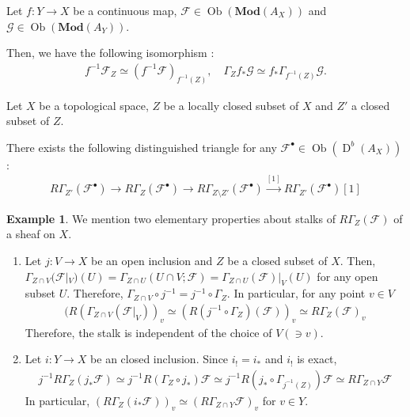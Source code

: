 \documentclass[a4paper,dvipdfmx,reqno,12pt]{amsart}
\theoremstyle{definition}
\newtheorem{Eg}[Thm]{Example}
\newcommand{\mcal}[1]{\mathcal{#1}}%
\newcommand{\opn}[1]{\operatorname{#1}}
\newcommand{\catn}[1]{\mathbf{#1}}
\newcommand{\xto}[1]{\xrightarrow{#1}}
\numberwithin{equation}{section}
\begin{document}
Let $f\colon Y\to X$ be a continuous map,
$\mathcal{F}\in \opn{Ob}(\catn{Mod}(A_X))$
and $\mathcal{G}\in\opn{Ob}(\catn{Mod}(A_Y))$.

Then, we have the following isomorphism 
\cite[(2.3.19)-(2.3.20)]{MR1299726}:
\begin{align}
f^{-1}\mathcal{F}_Z\simeq 
(f^{-1}\mathcal{F})_{f^{-1}(Z)},\quad 
\Gamma_Zf_*\mathcal{G}\simeq f_*\Gamma_{f^{-1}(Z)}
\mathcal{G}.
\end{align}


Let $X$ be a topological space, $Z$ be a locally 
closed subset of $X$ and $Z'$ a closed subset of $Z$.

There exists the following distinguished triangle 
for any $\mathcal{F}^{\bullet}\in \opn{Ob}(\opn{D}^{b}(A_X))$ 
\cite[(2.6.32)]{MR1299726}:
\begin{align} \label{eq: exactlocal}
  R\Gamma_{Z'}(\mcal{F}^{\bullet})\to 
R\Gamma_{Z}(\mcal{F}^{\bullet})\to 
R\Gamma_{Z\setminus Z'}(\mcal{F}^{\bullet})\xto{[1]} 
R\Gamma_{Z'}(\mcal{F}^{\bullet})[1]
\end{align}



\begin{Eg}

We mention two elementary properties 
about stalks of $R\Gamma_{Z}(\mcal{F})$ of a sheaf on 
$X$.

\begin{enumerate}
\item Let $j:V\to X$ be an open inclusion and $Z$ be a 
closed subset of $X$.
Then, $\Gamma_{Z\cap V}(\mcal{F}|_V)(U)=
\Gamma_{Z\cap U}(U\cap V;\mcal{F})=\Gamma_{Z\cap U}(\mcal{F})|_V(U)$
for any open subset $U$.
Therefore, $\Gamma_{Z\cap V}\circ j^{-1}=j^{-1}\circ \Gamma_{Z}$.
In particular, for any point $v\in V$
\begin{align}
  (R(\Gamma_{Z\cap V}(\mcal{F}|_{V}))_v\simeq (R(j^{-1}\circ \Gamma_{Z})(\mcal{F}))_v\simeq R\Gamma_{Z}(\mcal{F})_v
\end{align}
Therefore, the stalk is independent of 
the choice of $V (\ni v)$.
\item Let $i: Y\to X$ be an closed inclusion.
Since $i_!=i_*$ and $i_!$ is exact,
\begin{align}
  j^{-1}R\Gamma_{Z}(j_*\mcal{F})\simeq j^{-1}R(\Gamma_{Z}\circ j_*)\mcal{F}
  \simeq j^{-1}R(j_*\circ \Gamma_{j^{-1}(Z)})\mcal{F}
  \simeq R\Gamma_{Z\cap Y}\mcal{F}
\end{align}
In particular, $(R\Gamma_{Z}(i_*\mcal{F}))_v
  \simeq (R\Gamma_{Z\cap Y}\mcal{F})_v$ for $v\in Y$.
\end{enumerate}

\end{Eg}
\end{document}
